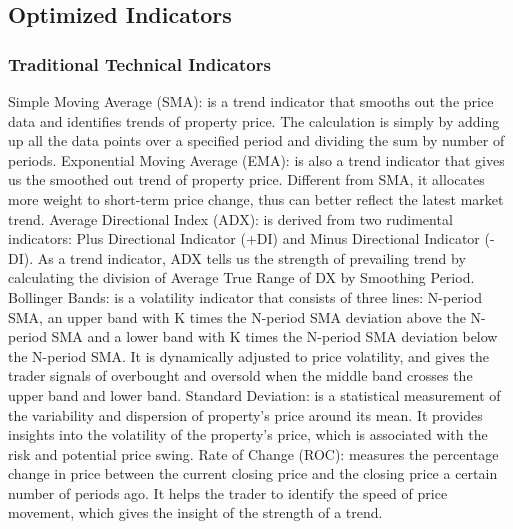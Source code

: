 \documentclass{article}
\begin{document}
\subsection{Optimized Indicators}
\subsubsection{Traditional Technical Indicators}
Simple Moving Average (SMA): is a trend indicator that smooths out the price data and identifies trends of property price. The calculation is simply by adding up all the data points over a specified period and dividing the sum by number of periods.
\newline
\newline
Exponential Moving Average (EMA): is also a trend indicator that gives us the smoothed out trend of property price. Different from SMA, it allocates more weight to short-term price change, thus can better reflect the latest market trend.
\newline
\newline
Average Directional Index (ADX): is derived from two rudimental indicators: Plus Directional Indicator (+DI) and Minus Directional Indicator (-DI). As a trend indicator, ADX tells us the strength of prevailing trend by calculating the division of Average True Range of DX by Smoothing Period.
\newline
\newline
Bollinger Bands: is a volatility indicator that consists of three lines: N-period SMA, an upper band with K times the N-period SMA deviation above the N-period SMA and a lower band with K times the N-period SMA deviation below the N-period SMA. It is dynamically adjusted to price volatility, and gives the trader signals of overbought and oversold when the middle band crosses the upper band and lower band.
\newline
\newline
Standard Deviation: is a statistical measurement of the variability and dispersion of property’s price around its mean. It provides insights into the volatility of the property’s price, which is associated with the risk and potential price swing. 
\newline
\newline
Rate of Change (ROC): measures the percentage change in price between the current closing price and the closing price a certain number of periods ago. It helps the trader to identify the speed of price movement, which gives the insight of the strength of a trend.
\newline
\end{document}

